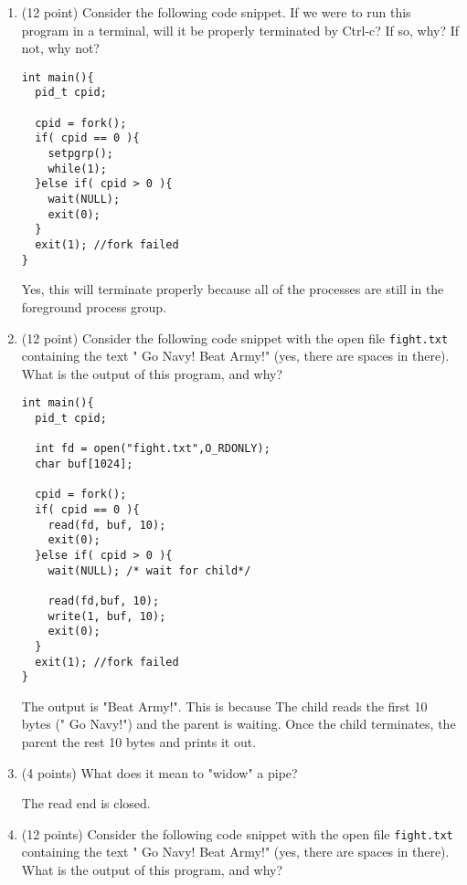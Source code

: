 \documentclass{article}[9pt]
\newenvironment{answerfont}{\fontfamily{qhv}\selectfont}{\par}
\newenvironment{myanswer}{\begin{mdframed}\begin{answerfont}}{\end{answerfont}\end{mdframed}}
\begin{document}
\begin{enumerate}
\item (12 point) Consider the following code snippet. If we were to run this
program in a terminal, will it be properly terminated by Ctrl-c?
If so, why? If not, why not?

\begin{verbatim}
int main(){
  pid_t cpid;

  cpid = fork();
  if( cpid == 0 ){
    setpgrp();
    while(1);
  }else if( cpid > 0 ){
    wait(NULL);
    exit(0);
  }
  exit(1); //fork failed
}
\end{verbatim}

  \begin{myanswer}
    Yes, this will terminate properly because all of the processes are
    still in the foreground process group.
  \end{myanswer}


\item (12 point) Consider the following code snippet with the open file
\texttt{fight.txt} containing the text " Go Navy! Beat Army!" (yes,
there are spaces in there).  What is the output of this program,
and why?

\begin{verbatim}
int main(){
  pid_t cpid;

  int fd = open("fight.txt",O_RDONLY);
  char buf[1024];

  cpid = fork();
  if( cpid == 0 ){
    read(fd, buf, 10);
    exit(0);
  }else if( cpid > 0 ){
    wait(NULL); /* wait for child*/

    read(fd,buf, 10);
    write(1, buf, 10);
    exit(0);
  }
  exit(1); //fork failed
}
\end{verbatim}

  \begin{myanswer}
    The output is "Beat Army!".  This is because The child reads the
    first 10 bytes (" Go Navy!") and the parent is waiting.  Once the
    child terminates, the parent the rest 10 bytes and prints it out.
  \end{myanswer}


\item (4 points) What does it mean to "widow" a pipe?

  \begin{myanswer}
    The read end is closed.
  \end{myanswer}


\item (12 points) Consider the following code snippet with the open file
\texttt{fight.txt} containing the text " Go Navy! Beat Army!" (yes,
there are spaces in there).  What is the output of this program,
and why?


\end{enumerate}
\end{document}
